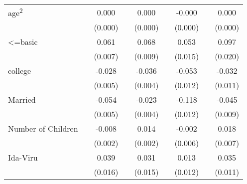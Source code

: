 \begin{sidewaystable}
\begin{tabular}{l*{2}{c}| *{2}{c}| *{2}{c}| *{2}{c}}
age\textsuperscript{2}   &                     &       0.000         &                     &       0.000\sym{***}&                     &      -0.000         &                     &       0.000         \\
&                     &     (0.000)         &                     &     (0.000)         &                     &     (0.000)         &                     &     (0.000)         \\
<=basic             &                     &       0.061\sym{***}&                     &       0.068\sym{***}&                     &       0.053\sym{***}&                     &       0.097\sym{***}\\
&                     &     (0.007)         &                     &     (0.009)         &                     &     (0.015)         &                     &     (0.020)         \\
college             &                     &      -0.028\sym{***}&                     &      -0.036\sym{***}&                     &      -0.053\sym{***}&                     &      -0.032\sym{***}\\
&                     &     (0.005)         &                     &     (0.004)         &                     &     (0.012)         &                     &     (0.011)         \\
Married             &                     &      -0.054\sym{***}&                     &      -0.023\sym{***}&                     &      -0.118\sym{***}&                     &      -0.045\sym{***}\\
&                     &     (0.005)         &                     &     (0.004)         &                     &     (0.012)         &                     &     (0.009)         \\
Number of Children  &                     &      -0.008\sym{***}&                     &       0.014\sym{***}&                     &      -0.002         &                     &       0.018\sym{***}\\
&                     &     (0.002)         &                     &     (0.002)         &                     &     (0.006)         &                     &     (0.007)         \\
Ida-Viru            &                     &       0.039\sym{**} &                     &       0.031\sym{**} &                     &       0.013         &                     &       0.035\sym{***}\\
&                     &     (0.016)         &                     &     (0.015)         &                     &     (0.012)         &                     &     (0.011)         \\

\end{tabular}
\end{sidewaystable}
